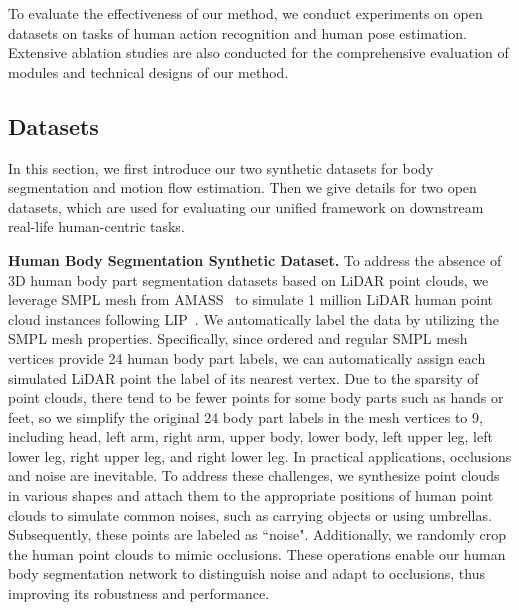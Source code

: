 To evaluate the effectiveness of our method, we conduct experiments on open datasets on tasks of human action recognition and human pose estimation.  
Extensive ablation studies are also conducted for the comprehensive evaluation of modules and technical designs of our method. 

\subsection{Datasets}
In this section, we first introduce our two synthetic datasets for body segmentation and motion flow estimation. Then we give details for two open datasets, which are used for evaluating our unified framework on downstream real-life human-centric tasks.

\textbf{Human Body Segmentation Synthetic Dataset. }
\label{subsubsec:HBPSegData}
To address the absence of 3D human body part segmentation datasets based on LiDAR point clouds, we leverage SMPL mesh from AMASS~\cite{mahmood2019amass} to simulate 1 million LiDAR human point cloud instances following LIP~\cite{ren2023lidar}. We automatically label the data by utilizing the SMPL mesh properties. Specifically, since ordered and regular SMPL mesh vertices provide 24 human body part labels, we can automatically assign each simulated LiDAR point the label of its nearest vertex. Due to the sparsity of point clouds, there tend to be fewer points for some body parts such as hands or feet, so we simplify the original 24 body part labels in the mesh vertices to 9, including head, left arm, right arm, upper body, lower body, left upper leg, left lower leg, right upper leg, and right lower leg.
In practical applications, occlusions and noise are inevitable. To address these challenges, we synthesize point clouds in various shapes and attach them to the appropriate positions of human point clouds to simulate common noises, such as carrying objects or using umbrellas. Subsequently, these points are labeled as ``noise". Additionally, we randomly crop the human point clouds to mimic occlusions. These operations enable our human body segmentation network to distinguish noise and adapt to occlusions, thus improving its robustness and performance. 


